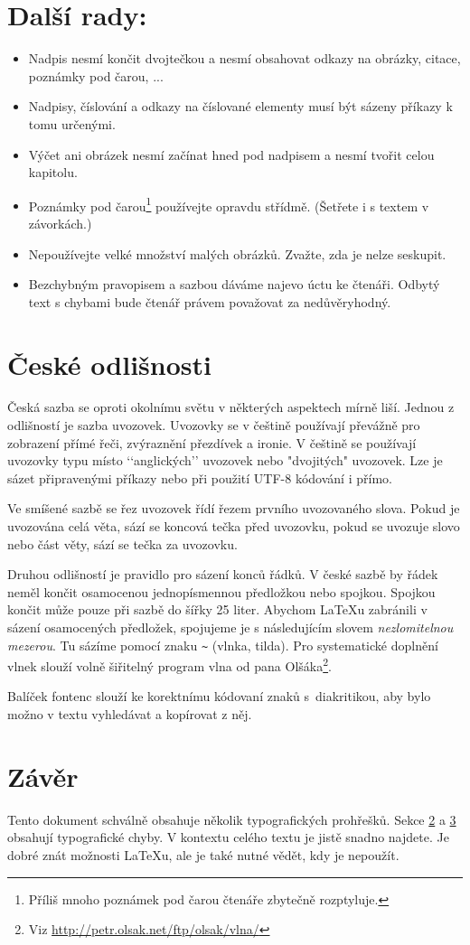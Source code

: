 \documentclass[10pt, twocolumn]{article}
\begin{document}
\section{Další rady:} \label{section3}
\begin{itemize}
\item Nadpis nesmí končit dvojtečkou a nesmí obsahovat odkazy na obrázky, citace, poznámky pod čarou, ...\smallskip
\item Nadpisy, číslování a odkazy na číslované elementy musí být sázeny příkazy k tomu určenými.
\item Výčet ani obrázek nesmí začínat hned pod nadpisem a nesmí tvořit celou kapitolu.
\item Poznámky pod čarou\footnote{Příliš mnoho poznámek pod čarou čtenáře zbytečně rozptyluje.} používejte opravdu střídmě. (Šetřete i s textem v závorkách.)
\item Nepoužívejte velké množství malých obrázků. Zvažte, zda je nelze seskupit.
\item Bezchybným pravopisem a sazbou dáváme najevo úctu ke čtenáři. Odbytý text s chybami bude čtenář právem považovat za nedůvěryhodný.
\end{itemize}

\section{České odlišnosti}
Česká sazba se oproti okolnímu světu v některých aspektech mírně liší. Jednou z odlišností je sazba uvozovek. Uvozovky se v češtině používají převážně pro zobrazení přímé řeči, zvýraznění přezdívek a ironie. V češtině se používají uvozovky typu  místo ‘‘anglických’’ uvozovek nebo "dvojitých" uvozovek. Lze je sázet připravenými příkazy nebo při použití UTF-8 kódování i přímo.

Ve smíšené sazbě se řez uvozovek řídí řezem prvního uvozovaného slova. Pokud je uvozována celá věta, sází se koncová tečka před uvozovku, pokud se uvozuje slovo nebo část věty, sází se tečka za uvozovku.

Druhou odlišností je pravidlo pro sázení konců řádků. V české sazbě by řádek neměl končit osamocenou jednopísmennou předložkou nebo spojkou. Spojkou  končit může pouze při sazbě do šířky 25 liter. Abychom \LaTeX u zabránili v sázení osamocených předložek, spojujeme je s následujícím slovem \textit{nezlomitelnou mezerou}. Tu sázíme pomocí znaku \verb|~| (vlnka, tilda). Pro systematické doplnění vlnek slouží volně šiřitelný program vlna od pana Olšáka\footnote{Viz \url{http://petr.olsak.net/ftp/olsak/vlna/}}.

Balíček fontenc slouží ke korektnímu kódovaní znaků s~diakritikou, aby bylo možno v textu vyhledávat a kopírovat z něj.

\section{Závěr}
Tento dokument schválně obsahuje několik typografických prohřešků. Sekce \hyperref[section2]{2} a \hyperref[section3]{3} obsahují typografické chyby. V kontextu celého textu je jistě snadno najdete. Je dobré znát možnosti LaTeXu, ale je také nutné vědět, kdy je nepoužít.
\end{document}
